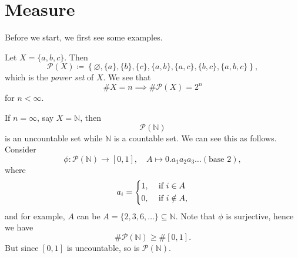 \chapter{Measure}\label{ch:Measure}
Before we start, we first see some examples.
\begin{eg}
	Let \(X = \{a, b, c\}\). Then
	\[
		\mathcal{P}(X)\coloneqq \left\{\varnothing , \{a\}, \{b\}, \{c\}, \{a, b\}, \{a, c\}, \{b, c\}, \{a, b, c\}\right\},
	\]
	which is the \emph{power set} of \(X\). We see that
	\[
		\# X = n \implies \# \mathcal{P}(X) = 2^n
	\]
	for \(n< \infty\).
\end{eg}
\begin{eg}
	If \(n = \infty\), say \(X = \mathbb{N} \), then
	\[
		\mathcal{P} (\mathbb{N} )
	\]
	is an uncountable set while \(\mathbb{N}\) is a countable set. We can see this as follows. Consider
	\[
		\phi\colon \mathcal{P}(\mathbb{N}) \to \left[0, 1\right],\quad A\mapsto 0.a_1 a_2 a_3 \dots (\text{base }2),
	\]
	where
	\[
		a_i = \begin{dcases}
			1, & \text{ if } i\in A     \\
			0, & \text{ if } i\notin A,
		\end{dcases}
	\]
	and for example, \(A\) can be
	\(A = \{2, 3, 6, \dots  \}\subseteq \mathbb{N}\). Note that \(\phi\) is surjective, hence we have
	\[
		\# \mathcal{P}(\mathbb{N} ) \geq \#\left[0, 1\right].
	\]
	But since \(\left[0, 1\right]\) is uncountable, so is \(\mathcal{P} (\mathbb{N} )\).
\end{eg}

